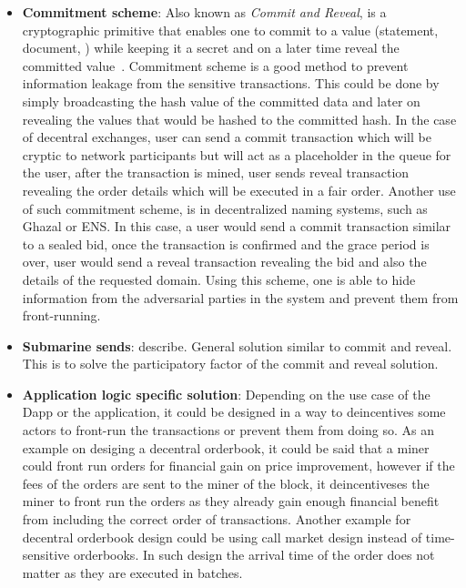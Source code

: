 \begin{itemize}
\item{\textbf{Commitment scheme}: Also known as \textit{Commit and Reveal}, is a cryptographic primitive that enables one to commit to a value (\eg statement, document, \etc}) while keeping it a secret and on a later time reveal the committed value~\cite{brassard1988minimum}. Commitment scheme is a good method to prevent information leakage from the sensitive transactions. This could be done by simply broadcasting the hash value of the committed data and later on revealing the values that would be hashed to the committed hash. 
In the case of decentral exchanges, user can send a commit transaction which will be cryptic to network participants but will act as a placeholder in the queue for the user, after the transaction is mined, user sends reveal transaction revealing the order details which will be executed in a fair order. Another use of such commitment scheme, is in decentralized naming systems, such as Ghazal or ENS. In this case, a user would send a commit transaction similar to a sealed bid, once the transaction is confirmed and the grace period is over, user would send a reveal transaction revealing the bid and also the details of the requested domain. Using this scheme, one is able to hide information from the adversarial parties in the system and prevent them from front-running.






\item{\textbf{Submarine sends}: describe. General solution similar to commit and reveal. This is to solve the participatory factor of the commit and reveal solution.}

\item{\textbf{Application logic specific solution}: Depending on the use case of  the Dapp or the application, it could be designed in a way to deincentives some actors to front-run the transactions or prevent them from doing so. As an example on desiging a decentral orderbook, it could be said that a miner could front run orders for financial gain on price improvement, however if the fees of the orders are sent to the miner of the block, it deincentiveses the miner to front run the orders as they already gain enough financial benefit from including the correct order of transactions. 
Another example for decentral orderbook design could be using call market design instead of  time-sensitive orderbooks. In such design the arrival time of the order does not matter as they are executed in batches. }


\end{itemize}



